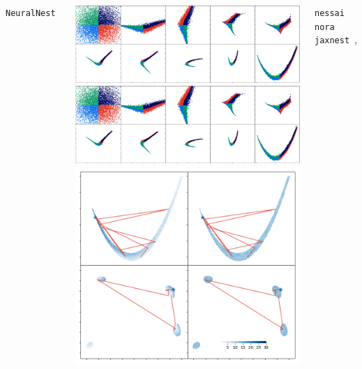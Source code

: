 \documentclass[aspectratio=169]{beamer}
\begin{document}
\begin{frame}
\begin{columns}[t]
        \vfill
        \texttt{NeuralNest}~
        \begin{columns}
            \includegraphics[width=\textwidth]{figures/rosenbrock_flow.png}
            \includegraphics[width=\textwidth]{figures/himmelblau_flow.png}
            \includegraphics[width=\textwidth]{figures/chains.png}
        \end{columns}
        \texttt{nessai}~ \texttt{nora}~ \texttt{jaxnest}~,

\end{columns}
\end{frame}
\end{document}
